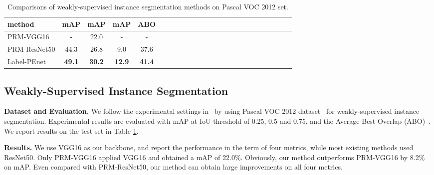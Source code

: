 \documentclass[10pt,twocolumn,letterpaper]{article}
\begin{document}
\begin{table}[!t]\small
	\setlength{\abovecaptionskip}{10pt}
	\setlength{\belowcaptionskip}{-10pt}
	\begin{center}
		\resizebox{0.4\textwidth}{!}
		{
			\begin{tabular}{@{}lccccccccccccccccccccccc@{}}
				\toprule
				method                              & mAP & mAP  & mAP  & ABO            \\ \midrule
				PRM-VGG16    \cite{zhou2018weakly}  & -              & 22.0           & -               & -              \\
				PRM-ResNet50 \cite{zhou2018weakly}  & 44.3           & 26.8           & 9.0             & 37.6           \\ \midrule
				Label-PEnet                           & \textbf{49.1}  & \textbf{30.2}  & \textbf{12.9}   & \textbf{41.4}  \\
				\bottomrule
			\end{tabular}
		}
	\end{center}
\vspace{-3mm}
	\caption{Comparisons of weakly-supervised instance segmentation methods on Pascal VOC 2012  set.}
	\label{voc12_instance}
\end{table}

\subsection{Weakly-Supervised Instance Segmentation}
\noindent\textbf{Dataset and Evaluation.} We follow the experimental settings in~\cite{zhou2018weakly} by using Pascal VOC 2012 dataset~\cite{everingham2015pascal} for weakly-supervised instance segmentation. Experimental results are evaluated with mAP at IoU threshold of 0.25, 0.5 and 0.75, and the Average Best Overlap (ABO)~\cite{pont2015boosting}. We report results on the test set in Table \ref{voc12_instance}.

\noindent\textbf{Results.} We use VGG16 as our backbone, and report the performance in the term of four metrics, while most existing methods used ResNet50. Only PRM-VGG16 applied VGG16 and obtained a mAP of 22.0\%. Obviously, our method outperforms PRM-VGG16 by 8.2\% on  mAP. Even compared with PRM-ResNet50, our method can obtain large improvements on all four metrics.
\end{document}
